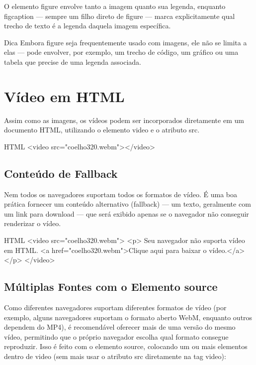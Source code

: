 O elemento figure envolve tanto a imagem quanto sua legenda, enquanto figcaption — sempre um filho direto de figure — marca explicitamente qual trecho de texto é a legenda daquela imagem específica.

\begin{infobox}{Dica}
Embora figure seja frequentemente usado com imagens, ele não se limita a elas — pode envolver, por exemplo, um trecho de código, um gráfico ou uma tabela que precise de uma legenda associada.
\end{infobox}

\section{Vídeo em HTML}

Assim como as imagens, os vídeos podem ser incorporados diretamente em um documento HTML, utilizando o elemento video e o atributo src.

\begin{codebox}{HTML}
<video src="coelho320.webm"></video>
\end{codebox}

\subsection{Conteúdo de Fallback}

Nem todos os navegadores suportam todos os formatos de vídeo. É uma boa prática fornecer um conteúdo alternativo (fallback) — um texto, geralmente com um link para download — que será exibido apenas se o navegador não conseguir renderizar o vídeo.

\begin{codebox}{HTML}
<video src="coelho320.webm">
  <p>
    Seu navegador não suporta vídeo em HTML.
    <a href="coelho320.webm">Clique aqui para baixar o vídeo.</a>
  </p>
</video>
\end{codebox}

\subsection{Múltiplas Fontes com o Elemento source}

Como diferentes navegadores suportam diferentes formatos de vídeo (por exemplo, alguns navegadores suportam o formato aberto WebM, enquanto outros dependem do MP4), é recomendável oferecer mais de uma versão do mesmo vídeo, permitindo que o próprio navegador escolha qual formato consegue reproduzir. Isso é feito com o elemento source, colocando um ou mais elementos dentro de video (sem mais usar o atributo src diretamente na tag video):


